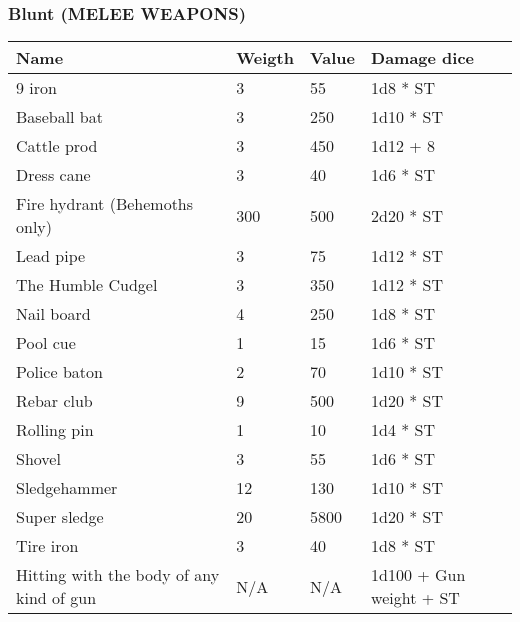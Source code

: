 
\subsubsection{Blunt (MELEE WEAPONS)}
\begin{longtable}{|p{4cm}|p{1.5cm}|p{1.5cm}|p{4cm}|}
\hline
\bfseries Name &  \bfseries Weigth & \bfseries Value & \bfseries Damage dice \\
\hline
\endhead
9 iron  & 3 & 55 & 1d8 * ST \\
Baseball bat & 3 & 250 & 1d10 * ST \\
Cattle prod  & 3 & 450 & 1d12 + 8 \\
Dress cane  & 3 & 40 & 1d6 * ST \\
Fire hydrant (Behemoths only) & 300 & 500 & 2d20 * ST \\
Lead pipe  & 3 & 75 & 1d12 * ST \\
The Humble Cudgel  & 3 & 350 & 1d12 * ST \\
Nail board  & 4 & 250 & 1d8 * ST \\
Pool cue  & 1 & 15 & 1d6 * ST \\
Police baton  & 2 & 70 & 1d10 * ST \\
Rebar club  & 9 & 500 & 1d20 * ST \\
Rolling pin  & 1 & 10 & 1d4 * ST \\
Shovel  & 3 & 55 & 1d6 * ST \\
Sledgehammer  & 12 & 130 & 1d10 * ST \\
Super sledge  & 20 & 5800 & 1d20 * ST \\
Tire iron  & 3 & 40 & 1d8 * ST \\
Hitting with the body of any kind of gun & N/A & N/A & 1d100 + Gun weight + ST \\
\hline
\end{longtable}
